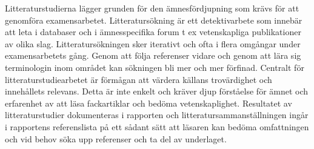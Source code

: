 Litteraturstudierna lägger grunden för den ämnesfördjupning som krävs
för att genomföra examensarbetet. Litteratursökning är ett
detektivarbete som innebär att leta i databaser och i ämnesspecifika
forum t ex vetenskapliga publikationer av olika slag.
Litteratursökningen sker iterativt och ofta i flera omgångar under
examensarbetets gång. Genom att följa referenser vidare och genom att
lära sig terminologin inom området kan sökningen bli mer och mer
förfinad. Centralt för litteraturstudiearbetet är förmågan att värdera
källans trovärdighet och innehållets relevans. Detta är inte enkelt och
kräver djup förståelse för ämnet och erfarenhet av att läsa fackartiklar
och bedöma vetenskaplighet. Resultatet av litteraturstudier dokumenteras
i rapporten och litteratursammanställningen ingår i rapportens
referenslista på ett sådant sätt att läsaren kan bedöma omfattningen och
vid behov söka upp referenser och ta del av underlaget.
